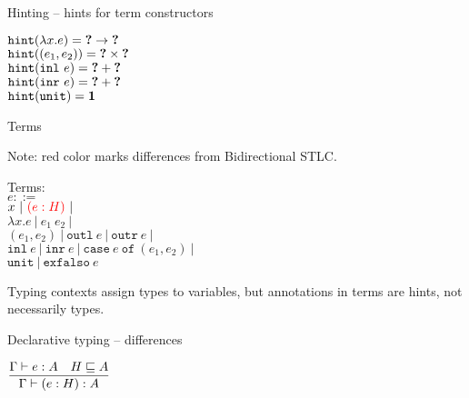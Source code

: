 \documentclass{beamer}
\newcommand{\pipe}{\ |\ }
\newcommand{\Fun}[2]{#1 \to #2}
\newcommand{\Prod}[2]{#1 \times #2}
\newcommand{\Sum}[2]{#1 + #2}
\newcommand{\Unit}{\textbf{1}}
\newcommand{\annot}[2]{(#1 : #2)}
\newcommand{\fun}[2]{\lambda #1. #2}
\newcommand{\app}[2]{#1\ #2}
\newcommand{\pair}[2]{(#1, #2)}
\newcommand{\outl}[1]{\texttt{outl}\ #1}
\newcommand{\outr}[1]{\texttt{outr}\ #1}
\newcommand{\inl}[1]{\texttt{inl}\ #1}
\newcommand{\inr}[1]{\texttt{inr}\ #1}
\newcommand{\case}[3]{\texttt{case}\ #1\ \texttt{of}\ (#2, #3)}
\newcommand{\unit}{\texttt{unit}}
\newcommand{\exfalso}[1]{\texttt{exfalso}\ #1}
\newcommand{\fulltyping}[3]{#1 \vdash #2 : #3}
\newcommand{\typing}[2]{\fulltyping{\Gamma}{#1}{#2}}
\newcommand{\rulename}[1]{\textsc{\footnotesize{#1}}}
\newcommand{\infrule}[3][]{\displaystyle \frac{#2}{#3} \rulename{#1}}
\newcommand{\sidecond}[1]{#1}
\begin{document}
\begin{frame}{Hinting -- hints for term constructors}

\begin{center}
  $\hintfor{\fun{x}{e}} = \Fun{\Hole}{\Hole}$ \\
  $\hintfor{\pair{e_1}{e_2}} = \Prod{\Hole}{\Hole}$ \\
  $\hintfor{\inl{e}} = \Sum{\Hole}{\Hole}$ \\
  $\hintfor{\inr{e}} = \Sum{\Hole}{\Hole}$ \\
  $\hintfor{\unit} = \Unit$
\end{center}

\end{frame}

\begin{frame}{Terms}

Note: red color marks differences from Bidirectional STLC.

\vspace{2em}

Terms: \\
$e ::=$ \\
\qquad $x \pipe \termdiff{\annot{e}{H}} \pipe $ \\
\qquad $\fun{x}{e} \pipe \app{e_1}{e_2} \pipe$ \\
\qquad $\pair{e_1}{e_2} \pipe \outl{e} \pipe \outr{e} \pipe$ \\
\qquad $\inl{e} \pipe \inr{e} \pipe \case{e}{e_1}{e_2} \pipe$ \\
\qquad $\unit \pipe \exfalso{e}$

\vspace{2em}

Typing contexts assign types to variables, but annotations in terms are hints, not necessarily types.

\end{frame}

\begin{frame}{Declarative typing -- differences}

\begin{center}
  $\infrule{\typing{e}{A} \quad \sidecond{\hintorder{H}{A}}}{\typing{\annot{e}{H}}{A}}$
\end{center}

\end{frame}
\end{document}
